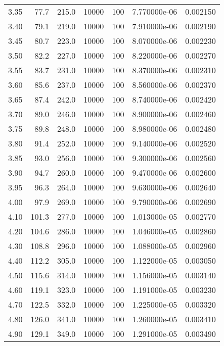 \begin{tabular}{rrrrrrr}
    3.35 &      77.7 &     215.0 & 10000 &  100 & 7.770000e-06 & 0.002150 \\
    3.40 &      79.1 &     219.0 & 10000 &  100 & 7.910000e-06 & 0.002190 \\
    3.45 &      80.7 &     223.0 & 10000 &  100 & 8.070000e-06 & 0.002230 \\
    3.50 &      82.2 &     227.0 & 10000 &  100 & 8.220000e-06 & 0.002270 \\
    3.55 &      83.7 &     231.0 & 10000 &  100 & 8.370000e-06 & 0.002310 \\
    3.60 &      85.6 &     237.0 & 10000 &  100 & 8.560000e-06 & 0.002370 \\
    3.65 &      87.4 &     242.0 & 10000 &  100 & 8.740000e-06 & 0.002420 \\
    3.70 &      89.0 &     246.0 & 10000 &  100 & 8.900000e-06 & 0.002460 \\
    3.75 &      89.8 &     248.0 & 10000 &  100 & 8.980000e-06 & 0.002480 \\
    3.80 &      91.4 &     252.0 & 10000 &  100 & 9.140000e-06 & 0.002520 \\
    3.85 &      93.0 &     256.0 & 10000 &  100 & 9.300000e-06 & 0.002560 \\
    3.90 &      94.7 &     260.0 & 10000 &  100 & 9.470000e-06 & 0.002600 \\
    3.95 &      96.3 &     264.0 & 10000 &  100 & 9.630000e-06 & 0.002640 \\
    4.00 &      97.9 &     269.0 & 10000 &  100 & 9.790000e-06 & 0.002690 \\
    4.10 &     101.3 &     277.0 & 10000 &  100 & 1.013000e-05 & 0.002770 \\
    4.20 &     104.6 &     286.0 & 10000 &  100 & 1.046000e-05 & 0.002860 \\
    4.30 &     108.8 &     296.0 & 10000 &  100 & 1.088000e-05 & 0.002960 \\
    4.40 &     112.2 &     305.0 & 10000 &  100 & 1.122000e-05 & 0.003050 \\
    4.50 &     115.6 &     314.0 & 10000 &  100 & 1.156000e-05 & 0.003140 \\
    4.60 &     119.1 &     323.0 & 10000 &  100 & 1.191000e-05 & 0.003230 \\
    4.70 &     122.5 &     332.0 & 10000 &  100 & 1.225000e-05 & 0.003320 \\
    4.80 &     126.0 &     341.0 & 10000 &  100 & 1.260000e-05 & 0.003410 \\
    4.90 &     129.1 &     349.0 & 10000 &  100 & 1.291000e-05 & 0.003490 \\

\end{tabular}
